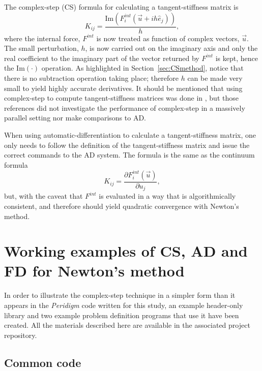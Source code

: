 \documentclass[preprint,12pt]{elsarticle}
\begin{document}
The complex-step (CS) formula for calculating a tangent-stiffness matrix is
%
\begin{equation} K_{ij} = \frac{\mbox{Im}(F_i^{int}(\vec{u} + i h
\hat{e}_j))}{h}, \end{equation}
%
where the internal force, $F^{int}$ is now treated as function of complex
vectors,  $\vec{u}$. The small perturbation, $h$, is now carried out on the
imaginary axis and only the real coefficient to the imaginary part of the
vector returned by $F^{int}$ is kept, hence the $\mbox{Im}(\cdot)$ operation.
As highlighted in Section~\ref{sec:CSmethod}, notice that there is no
subtraction operation taking place; therefore $h$ can be made very small to
yield highly accurate derivatives. It should be mentioned that using
complex-step to compute tangent-stiffness matrices was done in
\cite{perez2000numerical,perez2012numerical}, but those references did not
investigate the performance of complex-step in a massively parallel setting nor
make comparisons to AD. 

When using automatic-differentiation to calculate a tangent-stiffness matrix,
one only needs to follow the definition of the tangent-stiffness matrix and
issue the correct commands to the AD system. The formula is the same as the
continuum formula
%
\begin{equation} K_{ij} = \frac{\partial F_i^{int}(\vec{u})}{\partial u_j},
\end{equation}
%
but, with the caveat that $F^{int}$ is evaluated in a way that is
algorithmically consistent, and therefore should yield quadratic convergence
with Newton's method.

\section{Working examples of CS, AD and FD for Newton's method}
\label{sec:WorkingExamples}
In order to illustrate the complex-step technique in a simpler form than it
appears in the \emph{Peridigm} code written for this study, an example
header-only library and two example problem definition programs that use it
have been created. All the materials described here are available in the
associated project repository.

\subsection{Common code} 
\label{subsec:CommonCode} 
\end{document}
